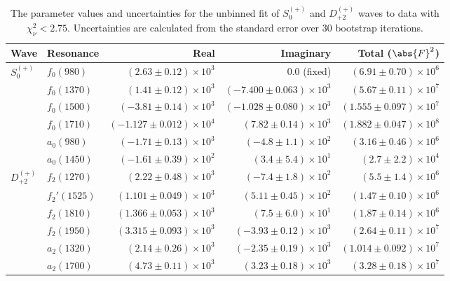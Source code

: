 \begin{table}
    \begin{center}
        \begin{tabular}{llrrr}\toprule
        Wave & Resonance & Real & Imaginary & Total ($\abs{F}^2$) \\\midrule
$S_{0}^{(+)}$ & $f_{0}(980)$ & $(2.63 \pm 0.12) \times 10^{3}$ & $0.0$ (fixed) & $(6.91 \pm 0.70) \times 10^{6}$ \\
 & $f_{0}(1370)$ & $(1.41 \pm 0.12) \times 10^{3}$ & $(-7.400 \pm 0.063) \times 10^{3}$ & $(5.67 \pm 0.11) \times 10^{7}$ \\
 & $f_{0}(1500)$ & $(-3.81 \pm 0.14) \times 10^{3}$ & $(-1.028 \pm 0.080) \times 10^{3}$ & $(1.555 \pm 0.097) \times 10^{7}$ \\
 & $f_{0}(1710)$ & $(-1.127 \pm 0.012) \times 10^{4}$ & $(7.82 \pm 0.14) \times 10^{3}$ & $(1.882 \pm 0.047) \times 10^{8}$ \\
 & $a_{0}(980)$ & $(-1.71 \pm 0.13) \times 10^{3}$ & $(-4.8 \pm 1.1) \times 10^{2}$ & $(3.16 \pm 0.46) \times 10^{6}$ \\
 & $a_{0}(1450)$ & $(-1.61 \pm 0.39) \times 10^{2}$ & $(3.4 \pm 5.4) \times 10^{1}$ & $(2.7 \pm 2.2) \times 10^{4}$ \\
$D_{+2}^{(+)}$ & $f_{2}(1270)$ & $(2.22 \pm 0.48) \times 10^{3}$ & $(-7.4 \pm 1.8) \times 10^{2}$ & $(5.5 \pm 1.4) \times 10^{6}$ \\
 & $f_{2}'(1525)$ & $(1.101 \pm 0.049) \times 10^{3}$ & $(5.11 \pm 0.45) \times 10^{2}$ & $(1.47 \pm 0.10) \times 10^{6}$ \\
 & $f_{2}(1810)$ & $(1.366 \pm 0.053) \times 10^{3}$ & $(7.5 \pm 6.0) \times 10^{1}$ & $(1.87 \pm 0.14) \times 10^{6}$ \\
 & $f_{2}(1950)$ & $(3.315 \pm 0.093) \times 10^{3}$ & $(-3.93 \pm 0.12) \times 10^{3}$ & $(2.64 \pm 0.11) \times 10^{7}$ \\
 & $a_{2}(1320)$ & $(2.14 \pm 0.26) \times 10^{3}$ & $(-2.35 \pm 0.19) \times 10^{3}$ & $(1.014 \pm 0.092) \times 10^{7}$ \\
 & $a_{2}(1700)$ & $(4.73 \pm 0.11) \times 10^{3}$ & $(3.23 \pm 0.18) \times 10^{3}$ & $(3.28 \pm 0.18) \times 10^{7}$ \\\bottomrule
        \end{tabular}
    \caption{The parameter values and uncertainties for the unbinned fit of $S_{0}^{(+)}$ and $D_{+2}^{(+)}$ waves to data with $\chi^2_\nu < 2.75$. Uncertainties are calculated from the standard error over $30$ bootstrap iterations.}\label{tab:unbinned-fit-chisqdof-2.8-Sp0p-Dp2p}
    \end{center}
\end{table}
